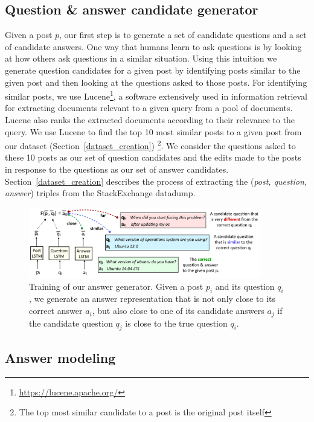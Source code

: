 \documentclass[11pt]{report}
\begin{document}
\subsection{Question \& answer candidate generator}\label{question_candidate_generator}

Given a post $p$, our first step is to generate a set of candidate questions and a set of candidate answers. One way that humans learn to ask questions is by looking at how others ask questions in a similar situation. Using this intuition we generate question candidates for a given post by identifying posts similar to the given post and then looking at the questions asked to those posts. For identifying similar posts, we use Lucene\footnote{\url{https://lucene.apache.org/}}, a software extensively used in information retrieval for extracting documents relevant to a given query from a pool of documents. Lucene also ranks the extracted documents according to their relevance to the query. We use Lucene to find the top 10 most similar posts to a given post from our dataset (Section~\ref{dataset_creation}) \footnote{The top most similar candidate to a post is the original post itself}. We consider the questions asked to these 10 posts as our set of question candidates and the edits made to the posts in response to the questions as our set of answer candidates. Section~\ref{dataset_creation} describes the process of extracting the (\textit{post, question, answer}) triples from the StackExchange datadump. 

\begin{figure}[ht]
\centering
\includegraphics[width=0.9\textwidth]{answer_generator}
\caption{Training of our answer generator. Given a post $p_i$ and its question $q_i$, we generate an answer representation that is not only close to its correct answer $a_i$, but also close to one of its candidate answers $a_j$ if the candidate question $q_j$ is close to the true question $q_i$.}
\label{fig_answer_generator}
\end{figure}

\subsection{Answer modeling}\label{answer_modeling}
\end{document}
